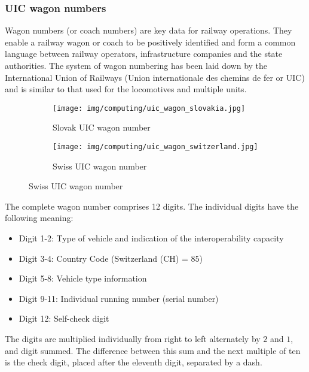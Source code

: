 	\subsubsection{UIC wagon numbers}
	Wagon numbers (or coach numbers) are key data for railway operations. They enable a railway wagon or coach to be positively identified and form a common language between railway operators, infrastructure companies and the state authorities. The system of wagon numbering has been laid down by the International Union of Railways (Union internationale des chemins de fer or UIC) and is similar to that used for the locomotives and multiple units.
	\begin{figure}[H]
		\centering
		\begin{subfigure}{0.4\textwidth}
			\texttt{[image: img/computing/uic\_wagon\_slovakia.jpg]}
			\caption{Slovak UIC wagon number}
		\end{subfigure}
		\begin{subfigure}{0.4\textwidth}
			\texttt{[image: img/computing/uic\_wagon\_switzerland.jpg]}
			\caption{Swiss UIC wagon number}
		\end{subfigure}				
	\end{figure}
	The complete wagon number comprises 12 digits. The individual digits have the following meaning:
	\begin{itemize}
		\item Digit 1-2: Type of vehicle and indication of the interoperability capacity

		\item Digit 3-4: Country Code (Switzerland (CH) = $85$)

		\item Digit 5-8: Vehicle type information

		\item Digit 9-11: Individual running number (serial number)
		
		\item Digit 12: Self-check digit
	\end{itemize}
	The digits are multiplied individually from right to left alternately by $2$ and $1$, and digit summed. The difference between this sum and the next multiple of ten is the check digit, placed after the eleventh digit, separated by a dash.
